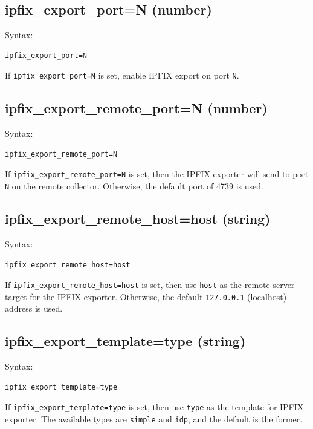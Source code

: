 \documentclass{book}
\begin{document}
\subsection{ipfix\_export\_port=N (number)}
\label{ipfixexportport}
\begin{mdframed}[style=aaa]
Syntax:
  \begin{verbatim}
ipfix_export_port=N        
  \end{verbatim}
\end{mdframed}
If \texttt{ipfix\_export\_port=N} is set, enable IPFIX export on port
\texttt{N}.

\subsection{ipfix\_export\_remote\_port=N (number)}
\label{ipfixexportremoteport}
\begin{mdframed}[style=aaa]
Syntax:
  \begin{verbatim}
ipfix_export_remote_port=N 
  \end{verbatim}
\end{mdframed}
If \texttt{ipfix\_export\_remote\_port=N} is set, then the IPFIX
exporter will send to port \texttt{N} on the remote collector.
Otherwise, the default port of 4739 is used.  

\subsection{ipfix\_export\_remote\_host=host (string)}
\label{ipfixexportremotehost}
\begin{mdframed}[style=aaa]
Syntax:
  \begin{verbatim}
ipfix_export_remote_host=host 
  \end{verbatim}
\end{mdframed}
If \texttt{ipfix\_export\_remote\_host=host} is set, then use
\texttt{host} as the remote server target for the IPFIX exporter.
Otherwise, the default \texttt{127.0.0.1} (localhost) address is used.

\subsection{ipfix\_export\_template=type (string)}
\label{ipfixexporttemplate}
\begin{mdframed}[style=aaa]
Syntax:
  \begin{verbatim}
ipfix_export_template=type 
  \end{verbatim}
\end{mdframed}
If \texttt{ipfix\_export\_template=type} is set, then use
\texttt{type} as the template for IPFIX exporter.  The available types
are \texttt{simple} and \texttt{idp}, and the default is the former.
\end{document}
